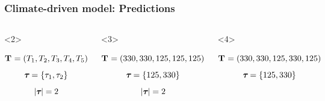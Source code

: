 \begin{frame}
    \frametitle{Climate-driven model: Predictions}
    \begin{columns}[c]
            \begin{onlyenv}<2>
            \begin{displaybox}[4.5cm]
                {\small
                \[
                    \mathbf{T_{}} = (T_{1},T_{2},T_{3},T_{4},T_{5})
                \]\vspace{0mm}
                }
                \[
                    \boldsymbol{\tau_{}} = \{\tau_{1},\tau_{2}\}
                \]\vspace{0mm}
                \[
                    \lvert \boldsymbol{\tau_{}} \rvert = 2
                \]\vspace{0mm}
            \end{displaybox}
            \end{onlyenv}
            \begin{onlyenv}<3>
            \begin{displaybox}[4.5cm]
                {\small
                \[
                    \mathbf{T_{}} = (330,330,125,125,125)
                \]\vspace{0mm}
                }
                \[
                    \boldsymbol{\tau_{}} = \{125,330\}
                \]\vspace{0mm}
                \[
                    \lvert \boldsymbol{\tau_{}} \rvert = 2
                \]\vspace{0mm}
            \end{displaybox}
            \end{onlyenv}
            \begin{onlyenv}<4>
            \begin{displaybox}[4.5cm]
                {\small
                \[
                    \mathbf{T_{}} = (330,330,125,330,125)
                \]\vspace{0mm}
                }
                \[
                    \boldsymbol{\tau_{}} = \{125,330\}
                \]\vspace{0mm}

\end{displaybox}
\end{onlyenv}
\end{columns}
\end{frame}
